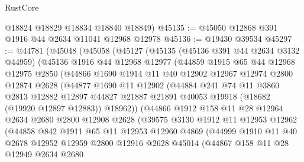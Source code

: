 \begin{lexlean}{RustCore}
\begin{coremodule}
      @18824
      @18829
      @18834
      @18840
      @18849)
@45135 := @45050 @12868 @391 @1916 @44 @2634 @11041 @12968 @12978
@45136 := @19430 @39534
@45297 := @44781
    (@45048
      (@45058
        (@45127
          (@45135
            (@45136 @391 @44 @2634 @3132 @44959)
            (@45136
              @1916
              @44
              @12968
              @12977
              (@44859
                @1915
                @65
                @44
                @12968
                @12975
                @2850
                (@44866
                  @1690
                  @1914
                  @11
                  @40
                  @12902
                  @12967
                  @12974
                  @2800
                  @12874
                  @2628
                  (@44877
                    @1690
                    @11
                    @12902
                    (@44884
                      @241
                      @74
                      @11
                      @3860
                      @2813
                      @12882
                      @12897
                      @44827
                      @21887
                      @21891
                      @40053
                      @19918
                      (@18682 (@19920 @12897 @12883))
                      @18962))
                  (@44866
                    @1912
                    @158
                    @11
                    @28
                    @12964
                    @2634
                    @2680
                    @2800
                    @12908
                    @2628
                    (@39575
                      @3130
                      @1912
                      @11
                      @12953
                      @12962
                      (@44858
                        @842
                        @1911
                        @65
                        @11
                        @12953
                        @12960
                        @4869
                        (@44999
                          @1910
                          @11
                          @40
                          @2678
                          @12952
                          @12959
                          @2800
                          @12916
                          @2628
                          @45014
                          (@44867
                            @158
                            @11
                            @28
                            @12949
                            @2634
                            @2680

\end{coremodule}
\end{lexlean}
